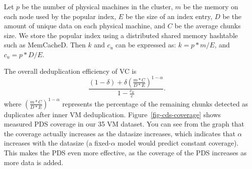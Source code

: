 


Let $p$ be the number of physical machines in the cluster, $m$ be the memory on each node used by the popular
index, $E$ be the size of an index entry,
$D$ be the amount of unique data on each physical machine, and 
$C$ be the average chunks size. We store the popular index using a distributed shared memory hashtable
such as MemCacheD.  Then $k$ and $c_u$ can be expressed as:
$
k = p*m/E$, and $c_u = p*D/E.
$

The overall deduplication efficiency of VC is
\[
\frac{ (1-\delta) + \delta (\frac{m*C}{D*E})^{1-\alpha}}
{ 1- \frac{c_u}{c} }.
\]
where $(\frac{m*C}{D*E})^{1-\alpha}$ represents the percentage of the remaining
chunks detected as duplicates after inner VM deduplication.
Figure~\ref{fig-cds-coverage} shows measured PDS coverage in our 35 VM dataset.
You can see from the graph that the coverage actually increases as the datasize
increases, which indicates that $\alpha$ increases with the datasize (a
fixed-$\alpha$ model would predict constant coverage). This makes the PDS even
more effective, as the coverage of the PDS increases as more data is added.







